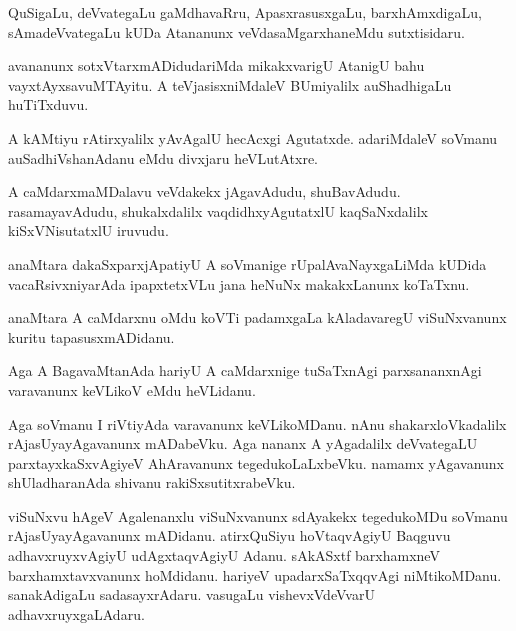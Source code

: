 \documentclass{article}
\begin{document}
\begin{mn}
QuSigaLu, deVvategaLu gaMdhavaRru, ApasxrasusxgaLu, barxhAmxdigaLu,
sAmadeVvategaLu kUDa Atananunx veVdasaMgarxhaneMdu sutxtisidaru.
\end{mn}

\begin{mn}
avananunx sotxVtarxmADidudariMda mikakxvarigU AtanigU bahu
vayxtAyxsavuMTAyitu. A teVjasisxniMdaleV BUmiyalilx auShadhigaLu huTiTxduvu.
\end{mn}

\begin{mn}
A kAMtiyu rAtirxyalilx yAvAgalU hecAcxgi Agutatxde. adariMdaleV
soVmanu auSadhiVshanAdanu eMdu divxjaru heVLutAtxre.
\end{mn}

\begin{mn}
A caMdarxmaMDalavu veVdakekx jAgavAdudu, shuBavAdudu. rasamayavAdudu,
shukalxdalilx vaqdidhxyAgutatxlU kaqSaNxdalilx kiSxVNisutatxlU iruvudu.
\end{mn}

\begin{mn}%
anaMtara dakaSxparxjApatiyU A soVmanige rUpalAvaNayxgaLiMda kUDida
vacaRsivxniyarAda ipapxtetxVLu jana heNuNx makakxLanunx koTaTxnu. 
\end{mn}

\begin{mn}
anaMtara A caMdarxnu oMdu koVTi padamxgaLa kAladavaregU viSuNxvanunx
kuritu tapasusxmADidanu.
\end{mn}

\begin{mn}
Aga A BagavaMtanAda hariyU A caMdarxnige tuSaTxnAgi parxsananxnAgi
varavanunx keVLikoV eMdu heVLidanu.
\end{mn}

\begin{mn}%
Aga soVmanu I riVtiyAda varavanunx keVLikoMDanu. nAnu
shakarxloVkadalilx rAjasUyayAgavanunx mADabeVku. Aga nananx A
yAgadalilx deVvategaLU parxtayxkaSxvAgiyeV AhAravanunx
tegedukoLaLxbeVku. namamx yAgavanunx shUladharanAda shivanu rakiSxsutitxrabeVku.
\end{mn}

\begin{mn}
viSuNxvu hAgeV Agalenanxlu viSuNxvanunx sdAyakekx tegedukoMDu soVmanu
rAjasUyayAgavanunx mADidanu. atirxQuSiyu hoVtaqvAgiyU Baqguvu
adhavxruyxvAgiyU udAgxtaqvAgiyU Adanu. sAkASxtf barxhamxneV
barxhamxtavxvanunx hoMdidanu. hariyeV upadarxSaTxqqvAgi
niMtikoMDanu. sanakAdigaLu sadasayxrAdaru. vasugaLu vishevxVdeVvarU adhavxruyxgaLAdaru.
\end{mn}
\end{document}
